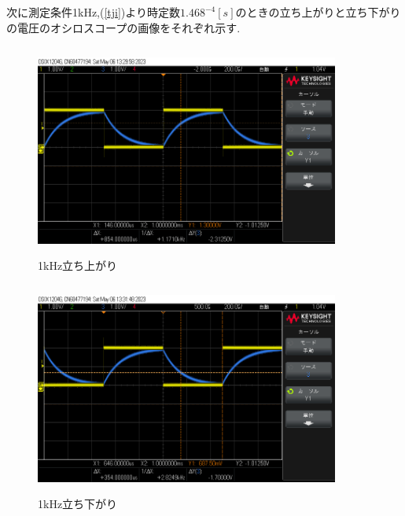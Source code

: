 \documentclass[a4j,10pt,dvipdfmx]{jarticle}
\begin{document}
次に測定条件1kHz,(\ref{tji})より時定数$1.468^{-4}[s]$のときの立ち上がりと立ち下がりの電圧のオシロスコープの画像をそれぞれ示す.
\begin{figure}[H]
  \begin{center}
  \includegraphics[height=7cm,width=10cm]{1khztatiagari.png}
  \caption{1kHz立ち上がり}
\end{center}
\end{figure}
\begin{figure}[H]
  \begin{center}
  \includegraphics[height=7cm,width=10cm]{1khztatisagari.png}
  \caption{1kHz立ち下がり}
\end{center}
\end{figure}
\end{document}
